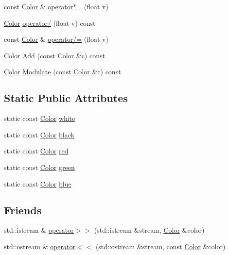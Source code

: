 \begin{DoxyCompactItemize}
\item 
const \hyperlink{class_agmd_utilities_1_1_color}{Color} \& \hyperlink{class_agmd_utilities_1_1_color_ae119c2510c25383bcf5afc25624b4ced}{operator$\ast$=} (float v)
\item 
\hyperlink{class_agmd_utilities_1_1_color}{Color} \hyperlink{class_agmd_utilities_1_1_color_ae226f65082357c68eecabe7f08a9949d}{operator/} (float v) const 
\item 
const \hyperlink{class_agmd_utilities_1_1_color}{Color} \& \hyperlink{class_agmd_utilities_1_1_color_a87aacf8af495f497b072ff454394e65e}{operator/=} (float v)
\item 
\hyperlink{class_agmd_utilities_1_1_color}{Color} \hyperlink{class_agmd_utilities_1_1_color_a9a96d1fca2ba3adee8bdd5ee8a0007bc}{Add} (const \hyperlink{class_agmd_utilities_1_1_color}{Color} \&c) const 
\item 
\hyperlink{class_agmd_utilities_1_1_color}{Color} \hyperlink{class_agmd_utilities_1_1_color_a4bc4ec5cc78d5700c20f31a87297b2fb}{Modulate} (const \hyperlink{class_agmd_utilities_1_1_color}{Color} \&c) const 
\end{DoxyCompactItemize}
\subsection*{Static Public Attributes}
\begin{DoxyCompactItemize}
\item 
static const \hyperlink{class_agmd_utilities_1_1_color}{Color} \hyperlink{class_agmd_utilities_1_1_color_a0767e43641e0fedc97189dac0f92a0bc}{white}
\item 
static const \hyperlink{class_agmd_utilities_1_1_color}{Color} \hyperlink{class_agmd_utilities_1_1_color_a8d77852434eecc09d00501616e8b227c}{black}
\item 
static const \hyperlink{class_agmd_utilities_1_1_color}{Color} \hyperlink{class_agmd_utilities_1_1_color_a655ac415b3c9eb868da4622a0fea03f4}{red}
\item 
static const \hyperlink{class_agmd_utilities_1_1_color}{Color} \hyperlink{class_agmd_utilities_1_1_color_a9e32af0a003b8fce5dd68e5ce2d36026}{green}
\item 
static const \hyperlink{class_agmd_utilities_1_1_color}{Color} \hyperlink{class_agmd_utilities_1_1_color_ad158e415eff25c8413fd07db658bc360}{blue}
\end{DoxyCompactItemize}
\subsection*{Friends}
\begin{DoxyCompactItemize}
\item 
std\+::istream \& \hyperlink{class_agmd_utilities_1_1_color_acc2dea3399f1de644acad7776c1eba0d}{operator$>$$>$} (std\+::istream \&stream, \hyperlink{class_agmd_utilities_1_1_color}{Color} \&color)
\item 
std\+::ostream \& \hyperlink{class_agmd_utilities_1_1_color_a2949bc642f18dffe591014eca1260be5}{operator$<$$<$} (std\+::ostream \&stream, const \hyperlink{class_agmd_utilities_1_1_color}{Color} \&color)
\end{DoxyCompactItemize}


